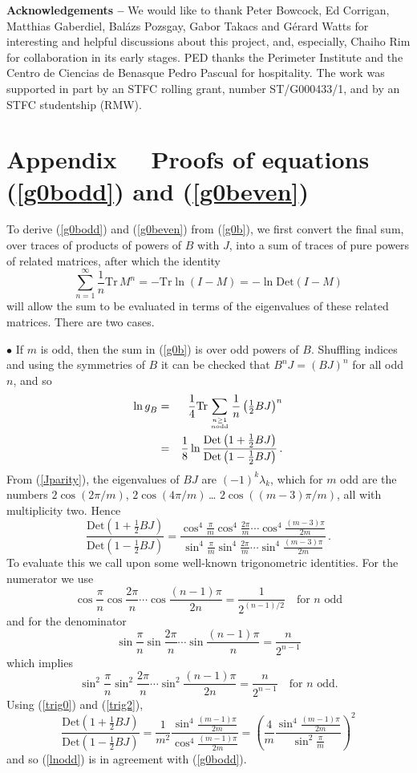 \documentclass[11pt]{article}
\newcommand\phup{^{\phantom o}}
\newcommand\beq{\begin{equation}}
\newcommand\eeq{\end{equation}}
\newcommand\nn{\nonumber}
\newcommand\half{{\textstyle\frac{1}{2}}}
\newcommand{\appsection}[1]{\addtocounter{section}{1}
\setcounter{equation}{0} \section*{Appendix \Alph{section}~~#1}}
\newcommand{\goB}{g\phup_{B}}
\begin{document}
\bigskip
\medskip
\noindent
{\bf Acknowledgements --}
We would like to thank Peter Bowcock, Ed Corrigan, Matthias Gaberdiel, 
Bal\'azs Pozsgay, Gabor Takacs and G\'erard Watts for interesting and 
helpful discussions about this project, and, especially, Chaiho Rim for
collaboration in its early stages.
PED thanks the Perimeter Institute and the Centro de Ciencias de 
Benasque Pedro Pascual for hospitality. The work was supported in part
by an STFC rolling grant, number ST/G000433/1, and by an STFC
studentship (RMW).

\appendix
\label{appA}
\appsection{Proofs of equations
(\ref{g0bodd}) and (\ref{g0beven})}
%
To derive (\ref{g0bodd}) and (\ref{g0beven}) from (\ref{g0b}), we 
first convert the final sum, over traces of products of powers of $B$
with $J$,
into a sum of traces of pure powers of
related matrices, after which the identity
\beq
\sum_{n=1}^{\infty}\frac{1}{n}\mbox{Tr}\,M^n
= -\mbox{Tr}\ln(I-M)
= -\ln\mbox{Det}(I-M)
\label{lntr}
\eeq
will allow the sum to be evaluated in terms of the eigenvalues of
these related matrices. There are two cases. 

\medskip

\noindent $\bullet$ If $m$ is odd, then the sum 
in (\ref{g0b}) is over odd powers of $B$. Shuffling indices and
using the symmetries of $B$ it can be checked that $B^nJ=(BJ)^n$ for
all odd $n$, and so 
\begin{eqnarray}
 \ln \goB&=&
\frac{1}{4}
\mbox{Tr}
\sum_{n\ge 1\atop n {\rm odd}}
\frac{1}{n}\left(\half BJ\right)^n\nn\\
&=&\frac{1}{8}
\ln\frac{\mbox{Det}\left(1+\half BJ\right)}{\mbox{Det}\left(1-\half
BJ\right)}\,.
\label{lnodd}
\end{eqnarray}
From (\ref{Jparity}), the
eigenvalues of $BJ$ are $(-1)^k\lambda_k$, which for $m$ odd are the
numbers $2\cos(2\pi/m)$, $2\cos(4\pi/m)$\,\dots
$2\cos((m{-}3)\pi/m)$, all with multiplicity two. Hence 
\begin{equation}
\frac{\mbox{Det}\left(1+\half BJ\right)}{\mbox{Det}\left(1-\half
BJ\right)}=
\frac{\cos^4\frac{\pi}{m}\cos^4\frac{2\pi}{m}\cdots\cos^4\frac{(m-3)\pi}{2m}}%
{\sin^4\frac{\pi}{m}\sin^4\frac{2\pi}{m}\cdots\sin^4\frac{(m-3)\pi}{2m}}\,.
\end{equation}
To evaluate this we call upon some well-known trigonometric
identities. For the numerator we use
\begin{equation}
\cos\frac{\pi}{n}\cos\frac{2\pi}{n}\cdots\cos\frac{(n-1)\pi}{2n}=
\frac{1}{2^{(n-1)/2}}\quad\mbox{for $n$ odd}
\label{trig0}
\end{equation}
and for the denominator 
\beq
\sin\frac{\pi}{n}\sin\frac{2\pi}{n}\cdots\sin\frac{(n-1)\pi}{n}=
\frac{n}{2^{n-1}}
\label{trig}
\eeq
which implies
\beq\sin^2\frac{\pi}{n}\sin^2\frac{2\pi}{n}\cdots\sin^2\frac{(n-1)\pi}{2n}
=\frac{n}{2^{n-1}}\quad\mbox{for $n$ odd.}
\label{trig2}\eeq
Using (\ref{trig0}) and (\ref{trig2}),
\beq
 \frac{\mbox{Det}\left(1+\half BJ\right)}%
{\mbox{Det}\left(1-\half BJ\right)}=
\frac{1}{m^2}\frac{\sin^4\frac{(m-1)\pi}{2m}}{\cos^4\frac{(m-1)\pi}{2m}}
=\left(\frac{4}{m}\frac{\sin^4\frac{(m-1)\pi}{2m}}%
{\sin^2\frac{\pi}{m}}\right)^2
\eeq
and so (\ref{lnodd}) is in agreement with (\ref{g0bodd}).
\end{document}
